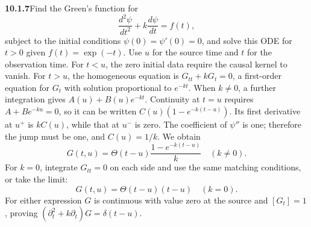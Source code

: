 \par\bigskip
\noindent\textbf{10.1.7}\quad Find the Green's function for
\[
\frac{d^{2}\psi}{dt^{2}}+k\frac{d\psi}{dt}=f(t),
\]
subject to the initial conditions $\psi(0)=\psi'(0)=0$, and solve this ODE for
$t>0$ given $f(t)=\exp(-t)$.
\solution
Use $u$ for the source time and $t$ for the observation time.
For $t<u$, the zero initial data require the causal kernel to vanish.
For $t>u$, the homogeneous equation is $G_{tt}+kG_t=0$, a first-order
equation for $G_t$ with solution proportional to $e^{-kt}$. When
$k\ne0$, a further integration gives $A(u)+B(u)e^{-kt}$. Continuity
at $t=u$ requires $A+B e^{-ku}=0$, so it can be written
$C(u)(1-e^{-k(t-u)})$.
Its first derivative at $u^+$ is $kC(u)$, while that at $u^-$ is zero.
The coefficient of $\psi''$ is one; therefore the jump must be one,
and $C(u)=1/k$. We obtain
\[
\boxed{G(t,u)=\Theta(t-u)\frac{1-e^{-k(t-u)}}k\quad(k\ne0).}
\]
For $k=0$, integrate $G_{tt}=0$ on each side and use the same matching
conditions, or take the limit:
\[
\boxed{G(t,u)=\Theta(t-u)(t-u)\quad(k=0).}
\]
For either expression $G$ is continuous with value zero at the source
and $[G_t]=1$, proving $(\partial_t^2+k\partial_t)G=\delta(t-u)$.


